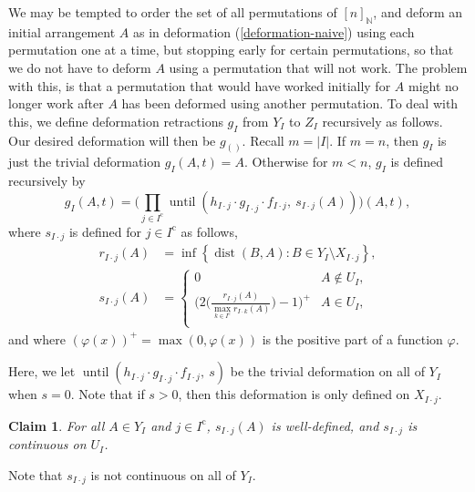 \documentclass[JEP,XML,SOM,Unicode,NoFloatCountersInSection,published]{cedram}
\newtheorem{claim}[theorem]{Claim}
\theoremstyle{remark}
\let\mb\mathbb
\let\phi\varphi
\newcommand{\compl}[1]{{{#1}^{\text{c}}}}
\DeclareMathOperator{\dist}{dist}
\DeclareMathOperator{\upto}{until}
\begin{document}
We may be tempted to order the set of all permutations of $[n]_\mb{N}$, and deform an initial arrangement $A$ as in deformation (\ref{deformation-naive}) using each permutation one at a time, but stopping early for certain permutations, so that we do not have to deform $A$ using a permutation that will not work. The problem with this, is that a permutation that would have worked initially for $A$ might no longer work after $A$ has been deformed using another permutation. To deal with this, we define deformation retractions $g_I$ from $Y_I$ to $Z_I$ recursively as follows. Our desired deformation will then be $g_{()}$.
Recall $m=|I|$.
If $m=n$, then $g_I$ is just the trivial deformation $g_I({A},t) = {A}$.
Otherwise for $m<n$, $g_I$ is defined recursively by
\begin{equation}\label{equation-g}
g_{I}({A},t) = \biggl( \prod_{j \in \compl{I} } \upto\left(h_{I \cdot j} \cdot g_{I \cdot j} \cdot f_{I \cdot j},\ s_{I \cdot j} ({A}) \right)\biggr) ({A},t),
\end{equation}
where $s_{I \cdot j}$ is defined for $j \in \compl{I}$ as follows,
\begin{align*}
r_{I\cdot j}(A) &= \inf \left\{\dist(B,A): B \in Y_{I} \setminus X_{I\cdot j} \right\},\\
s_{I \cdot j}(A) &= \begin{cases}
0 & A \not\in U_{I}, \\
\biggl(2\biggl(\frac{\displaystyle r_{I\cdot j}({A})}{\displaystyle \max_{k \in \compl{I}} r_{I\cdot k}({A}) }\biggr) -1 \biggr)^+ & A \in U_{I}, \\
\end{cases}
\end{align*}
and where $(\phi(x))^+ = \max(0,\phi(x))$ is the positive part of a function $\phi$.

Here, we let $\upto\left(h_{I \cdot j} \cdot g_{I \cdot j} \cdot f_{I \cdot j},\ s \right)$ be the trivial deformation on all of $Y_I$ when $s=0$. Note that if $s > 0$, then this deformation is only defined on $X_{I\cdot j}$.

\begin{claim}\label{claim-s}
For all $A \in Y_I$ and $j \in \compl{I}$, $s_{I\cdot j}(A)$ is well-defined, and $s_{I\cdot j}$ is continuous on $U_{I}$.
\end{claim}

Note that $s_{I\cdot j}$ is not continuous on all of $Y_I$.
\end{document}
